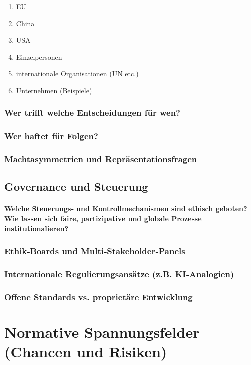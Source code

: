 \begin{enumerate}
    \item EU
    \item China
    \item USA
    \item Einzelpersonen
    \item internationale Organisationen (UN etc.)
    \item Unternehmen (Beispiele)
\end{enumerate}
 

\subsubsection{Wer trifft welche Entscheidungen für wen?}
\subsubsection{Wer haftet für Folgen?}
\subsubsection{Machtasymmetrien und Repräsentationsfragen}


\subsection{Governance und Steuerung}
\paragraph{Welche Steuerungs‑ und Kontrollmechanismen sind ethisch geboten? 
Wie lassen sich faire, partizipative und globale Prozesse institutionalieren?
}
\subsubsection{Ethik‑Boards und Multi‑Stakeholder‑Panels}
\subsubsection{Internationale Regulierungsansätze (z.B. KI‑Analogien)}
\subsubsection{Offene Standards vs. proprietäre Entwicklung}

\section{Normative Spannungsfelder (Chancen und Risiken)}

